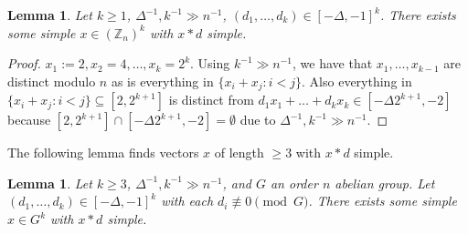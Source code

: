 \documentclass[a4paper,11pt,hidelinks]{amsart}
\newtheorem{lemma}[theorem]{Lemma}
\theoremstyle{definition}
\begin{document}
\begin{lemma}\label{Lemma_xastd_simple_cyclic} 
Let $k\geq 1$, $\Delta^{-1}, k^{-1}\gg n^{-1}$, $(d_1,\dots, d_k)\in [-\Delta,-1]^k$. There exists some simple $x\in (\mathbb{Z}_n)^k$ with $x\ast d$ simple.
\end{lemma}
\begin{proof}
$x_1:=2, x_2=4, \dots, x_k=2^{k}$. Using  $k^{-1}\gg n^{-1}$, we have that $x_1, \dots, x_{k-1}$ are distinct modulo $n$ as is everything in $\{x_i+x_j: i< j\}$. Also everything in $\{x_i+x_j: i< j\}\subseteq  [2, 2^{k+1}]$ is distinct from $d_1x_1+\dots+d_kx_k\in  [-\Delta2^{k+1}, -2]$ because  $ [2, 2^{k+1}] \cap [-\Delta2^{k+1}, -2]=\emptyset$  due to $\Delta^{-1}, k^{-1}\gg n^{-1}$. 
\end{proof}
The following lemma finds vectors $x$ of length $\geq 3$ with $x\ast d$ simple.
\begin{lemma}\label{Lemma_xastd_simple_k_at_least_3} 
Let $k\geq 3$, $\Delta^{-1}, k^{-1}\gg n^{-1}$,  and $G$ an order $n$ abelian group. Let $(d_1,\dots, d_k)\in [-\Delta, -1]^k$ with each $d_i\not\equiv 0 \pmod G$. There exists some simple $x\in G^k$ with $x\ast d$  simple.
\end{lemma}
\end{document}
